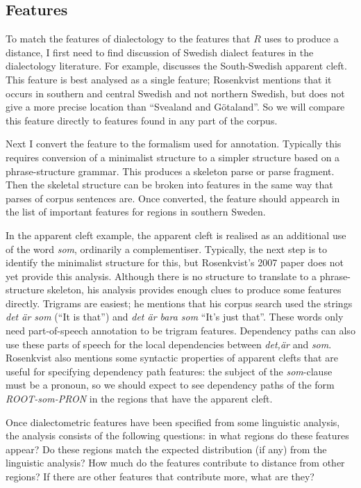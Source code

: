 \subsection{Features}

To match the features of dialectology to the features that $R$ uses to
produce a distance, I first need to find discussion of Swedish dialect
features in the dialectology literature. For example,
 discusses the South-Swedish apparent
cleft. This feature is best analysed as a single feature; Rosenkvist
mentions that it occurs in southern and central Swedish and not
northern Swedish, but does not give a more precise location than
``Svealand and G\"otaland''. So we will compare this feature directly
to features found in any part of the corpus.

Next I convert the feature to the formalism used for annotation.
Typically this requires conversion of a minimalist structure to a
simpler structure based on a phrase-structure grammar. This produces a
skeleton parse or parse fragment. Then the skeletal structure can be
broken into features in the same way that parses of corpus sentences
are. Once converted, the feature should appearch in the list of
important features for regions in southern Sweden.

In the apparent cleft example, the apparent cleft is realised as an
additional use of the word {\it som}, ordinarily a
complementiser. Typically, the next step is to identify the minimalist
structure for this, but Rosenkvist's 2007 paper does not yet provide
this analysis. Although there is no structure to translate to a
phrase-structure skeleton, his analysis provides enough clues to
produce some features directly. Trigrams are easiest; he mentions that
his corpus search used the strings {\it det \"ar som} (``It is that'')
and {\it det \"ar bara som} ``It's just that''. These words only need
part-of-speech annotation to be trigram features. Dependency
paths can also use these parts of speech for the local dependencies
between {\it det,\"ar} and {\it som}. Rosenkvist also mentions
some syntactic properties of apparent clefts that are useful for
specifying dependency path features: the subject of the {\it
  som}-clause must be a pronoun, so we should expect to see
dependency paths of the form {\it ROOT-som-PRON} in the regions that
have the apparent cleft.

Once dialectometric features have been specified from some linguistic
analysis, the analysis consists of the following questions: in what
regions do these features appear? Do these regions match the expected
distribution (if any) from the linguistic analysis? How much do
the features contribute to distance from other regions? If there are
other features that contribute more, what are they?

